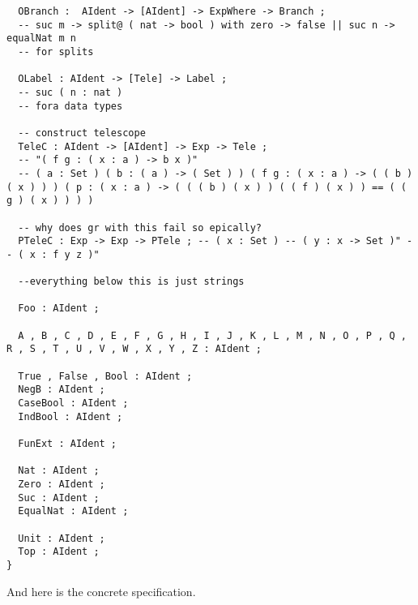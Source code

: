 \documentclass[11pt, a4paper]{article}
\begin{document}
\begin{verbatim}
  OBranch :  AIdent -> [AIdent] -> ExpWhere -> Branch ;
  -- suc m -> split@ ( nat -> bool ) with zero -> false || suc n -> equalNat m n
  -- for splits

  OLabel : AIdent -> [Tele] -> Label ;
  -- suc ( n : nat ) 
  -- fora data types

  -- construct telescope
  TeleC : AIdent -> [AIdent] -> Exp -> Tele ; 
  -- "( f g : ( x : a ) -> b x )"
  -- ( a : Set ) ( b : ( a ) -> ( Set ) ) ( f g : ( x : a ) -> ( ( b ) ( x ) ) ) ( p : ( x : a ) -> ( ( ( b ) ( x ) ) ( ( f ) ( x ) ) == ( ( g ) ( x ) ) ) )

  -- why does gr with this fail so epically?
  PTeleC : Exp -> Exp -> PTele ; -- ( x : Set ) -- ( y : x -> Set )" -- ( x : f y z )"

  --everything below this is just strings

  Foo : AIdent ;

  A , B , C , D , E , F , G , H , I , J , K , L , M , N , O , P , Q , R , S , T , U , V , W , X , Y , Z : AIdent ;

  True , False , Bool : AIdent ;
  NegB : AIdent ;
  CaseBool : AIdent ;
  IndBool : AIdent ;

  FunExt : AIdent ;

  Nat : AIdent ;
  Zero : AIdent ;
  Suc : AIdent ;
  EqualNat : AIdent ;

  Unit : AIdent ;
  Top : AIdent ;
}

\end{verbatim}

And here is the concrete specification.
\end{document}
